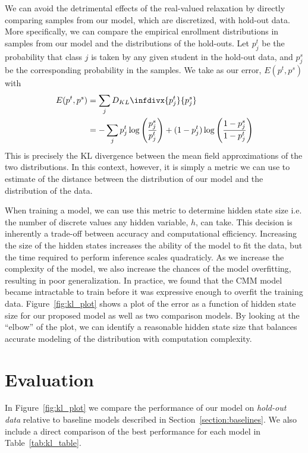 \documentclass{edm_template}
\newcommand{\infdiv}{D_{KL}\infdivx}
\begin{document}
We can avoid the detrimental effects of the real-valued relaxation by directly comparing samples from our model, which are discretized, with hold-out data. More specifically, we can compare the empirical enrollment distributions in samples from our model and the distributions of the hold-outs. Let $p^t_j$ be the probability that class $j$ is taken by any given student in the hold-out data, and $p^s_j$ be the corresponding probability in the samples. We take as our error, $E(p^t,p^s)$ with 
\begin{align*}
 E(p^t,p^s) 
 &= \sum_j \infdiv{p^t_j} {p^s_j} \\
 &= - \sum_j p^t_j \log \left( \frac{p^s_j}{p^t_j} \right) + (1 - p^t_j) \log \left(\frac{1-p^s_j}{1 - p^t_j} \right)
\end{align*}
This is precisely the KL divergence between the mean field approximations of the two distributions. In this context, however, it is simply a metric we can use to estimate of the distance between the distribution of our model and the distribution of the data. 

When training a model, we can use this metric to determine hidden state size i.e. the number of discrete values any hidden variable, $h$, can take. This decision is inherently a trade-off between accuracy and computational efficiency. Increasing the size of the hidden states increases the ability of the model to fit the data, but the time required to perform inference scales quadraticly. As we increase the complexity of the model, we also increase the chances of the model overfitting, resulting in poor generalization. In practice, we found that the CMM model became intractable to train before it was expressive enough to overfit the training data. Figure~\ref{fig:kl_plot} shows a plot of the error as a function of hidden state size for our proposed model as well as two comparison models. By looking at the ``elbow'' of the plot, we can identify a reasonable hidden state size that balances accurate modeling of the distribution with computation complexity.

\section{Evaluation}
\label{section:evaluation}



In Figure~\ref{fig:kl_plot} we compare the performance of our model on \textit{hold-out data} relative to baseline models described in Section~\ref{section:baselines}. We also include a direct comparison of the best performance for each model in Table~\ref{tab:kl_table}. 
\end{document}
